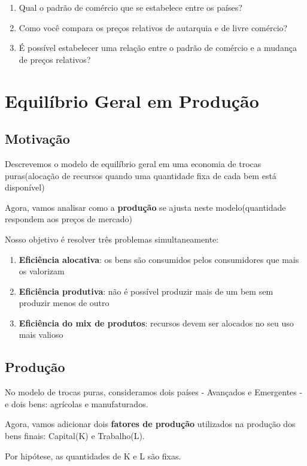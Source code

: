 \documentclass[a4paper,12pt]{article}[abntex2]
\begin{document}
\begin{enumerate}
    \item Qual o padrão de comércio que se estabelece entre os países?
    \item Como você compara os preços relativos de autarquia e de livre comércio?
    \item É possível estabelecer uma relação entre o padrão de comércio e a mudança de preços relativos?
\end{enumerate}
\newpage

\section{\textbf{Equilíbrio Geral em Produção}}

\subsection{\textbf{Motivação}}

Descrevemos o modelo de equilíbrio geral em uma economia de trocas puras(alocação de recursos quando uma quantidade fixa de cada bem está disponível)

Agora, vamos analisar como a \textbf{produção} se ajusta neste modelo(quantidade respondem aos preços de mercado)

Nosso objetivo é resolver três problemas simultaneamente:\begin{enumerate}
    \item \textbf{Eficiência alocativa}: os bens são consumidos pelos consumidores que mais os valorizam
    \item \textbf{Eficiência produtiva}: não é possível produzir mais de um bem sem produzir menos de outro
    \item \textbf{Eficiência do mix de produtos}: recursos devem ser alocados no seu uso mais valioso
\end{enumerate}

\subsection{\textbf{Produção}}

No modelo de trocas puras, consideramos dois países - Avançados e Emergentes - e dois bens: agrícolas e manufaturados.

Agora, vamos adicionar dois \textbf{fatores de produção} utilizados na produção dos bens finais: Capital(K) e Trabalho(L).

Por hipótese, as quantidades de K e L são fixas.
\end{document}
